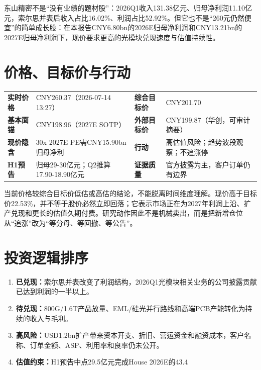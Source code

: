 
\begin{houseviewbox}[核心判断]
东山精密不是“没有业绩的题材股”：2026Q1收入131.38亿元、归母净利润11.10亿元，索尔思并表后收入占比16.02\%、利润占比52.92\%。但它也不是“260元仍然便宜”的简单成长股：在本报告CNY6.80bn的2026E归母净利润和CNY13.21bn的2027E归母净利润下，现价要求更高的光模块兑现速度与估值持续性。
\end{houseviewbox}

\section{价格、目标价与行动}
\begin{exhibitbox}
\begin{tabularx}{\exhibitboxwidth}{L{3.1cm}X L{3.1cm}X}
\textbf{实时价格} & CNY260.37（2026-07-14 13:27） & \textbf{综合目标价} & CNY201.70 \\
\textbf{基本面锚} & CNY198.96（2027E SOTP） & \textbf{外部目标价} & CNY199.87（华创，可审计摘要） \\
\textbf{现价隐含} & 30x 2027E PE需CNY15.90bn归母净利 & \textbf{行动} & 高估值风险；趋势波段观察；不追涨停 \\
\textbf{H1预告} & 归母29-30亿元；Q2推算17.90-18.90亿元 & \textbf{证据质量} & 官方披露为主，客户订单仍有边界 \\
\end{tabularx}
\end{exhibitbox}

当前价格较综合目标价低估或高估的结论，不能脱离时间维度理解。现价高于目标价22.53\%，并不等于股价必然立即回落；它表示市场正在为2027年利润上沿、扩产兑现和更长的估值久期付费。研究动作因此不是机械卖出，而是把新增仓位从“追涨”改为“等分母、等回撤、等公告”。

\section{投资逻辑排序}
\begin{enumerate}
\item \textbf{已兑现：}索尔思并表改变了利润结构，2026Q1光模块相关业务的公司披露贡献已达到利润的一半以上。
\item \textbf{待兑现：}800G/1.6T产品放量、EML/硅光并行路线和高端PCB产能转化为持续的收入与毛利。
\item \textbf{高风险：}USD1.2bn扩产带来资本开支、折旧、营运资金和融资成本，客户名称、订单金额、ASP、利用率和良率仍未公开。
\item \textbf{估值约束：}H1预告中点29.5亿元完成House 2026E的43.4%
\end{enumerate}

